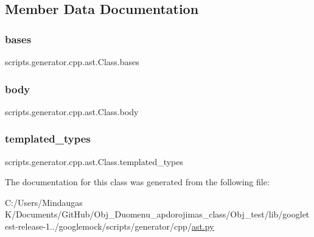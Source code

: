 \subsection{Member Data Documentation}
\mbox{\label{classscripts_1_1generator_1_1cpp_1_1ast_1_1_class_aaad5058196f4bf525a6fc2d18c760ad3}} 
\subsubsection{\texorpdfstring{bases}{bases}}
{\footnotesize\ttfamily scripts.\+generator.\+cpp.\+ast.\+Class.\+bases}

\mbox{\label{classscripts_1_1generator_1_1cpp_1_1ast_1_1_class_a43b72ebed2f3483dc597209fd7468536}} 
\subsubsection{\texorpdfstring{body}{body}}
{\footnotesize\ttfamily scripts.\+generator.\+cpp.\+ast.\+Class.\+body}

\mbox{\label{classscripts_1_1generator_1_1cpp_1_1ast_1_1_class_a3d1cc927ef0c536559f656321f64581e}} 
\subsubsection{\texorpdfstring{templated\_types}{templated\_types}}
{\footnotesize\ttfamily scripts.\+generator.\+cpp.\+ast.\+Class.\+templated\+\_\+types}



The documentation for this class was generated from the following file\+:\begin{DoxyCompactItemize}
\item 
C\+:/\+Users/\+Mindaugas K/\+Documents/\+Git\+Hub/\+Obj\+\_\+\+Duomenu\+\_\+apdorojimas\+\_\+class/\+Obj\+\_\+test/lib/googletest-\/release-\/1../googlemock/scripts/generator/cpp/\mbox{\hyperlink{_obj__test_2lib_2googletest-release-1_88_81_2googlemock_2scripts_2generator_2cpp_2ast_8py}{ast.\+py}}\end{DoxyCompactItemize}

